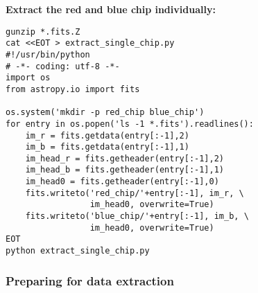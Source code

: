 \documentclass[10pt,a4paper]{article}
\begin{document}
\textbf{Extract the red and blue chip individually:}
\begin{lstlisting}[style=base]
gunzip *.fits.Z
cat <<EOT > extract_single_chip.py
#!/usr/bin/python
# -*- coding: utf-8 -*-
import os
from astropy.io import fits

os.system('mkdir -p red_chip blue_chip')
for entry in os.popen('ls -1 *.fits').readlines():
    im_r = fits.getdata(entry[:-1],2)
    im_b = fits.getdata(entry[:-1],1)
    im_head_r = fits.getheader(entry[:-1],2)
    im_head_b = fits.getheader(entry[:-1],1)
    im_head0 = fits.getheader(entry[:-1],0)
    fits.writeto('red_chip/'+entry[:-1], im_r, \
                 im_head0, overwrite=True)
    fits.writeto('blue_chip/'+entry[:-1], im_b, \
                 im_head0, overwrite=True)
EOT
python extract_single_chip.py
\end{lstlisting}


\subsubsection{Preparing for data extraction}
\end{document}
